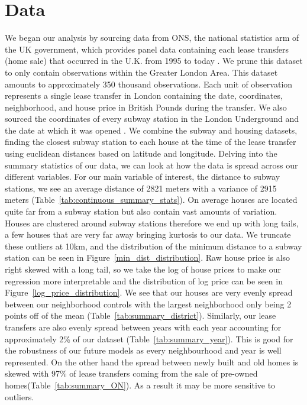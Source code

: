 \section{Data}
\label{sec:data}
We began our analysis by sourcing data from ONS, the national statistics arm of the UK government,
 which provides panel data containing each lease transfers (home sale) that occurred in the U.K. from 1995 to today \citep{land_ukgov}.
  We prune this dataset to only contain observations within the Greater London Area.
   This dataset amounts to approximately 350 thousand observations. Each unit of observation represents
    a single lease transfer in London containing the date, coordinates, neighborhood, and house price in British Pounds during the transfer.
      We also sourced the coordinates of every subway station in the
      London Underground and the date at which it was opened \citep{subway_wikipedia}. 
We combine the subway and housing datasets, finding the closest subway station to each house at the time of the lease transfer using euclidean distances based on latitude and longitude.
Delving into the summary statistics of our data, we can look at how the data is spread
 across our different variables. For our main variable of interest, the distance to subway stations, we see an
  average distance of 2821 meters with a variance of 2915 meters (Table~\ref{tab:continuous_summary_stats}). On average houses are located quite far from
   a subway station but also contain vast amounts of variation. Houses are clustered around subway stations therefore we end up with long tails, a few houses that are very far away bringing kurtosis to our data.
    We truncate these outliers at 10km, and the distribution of the minimum distance to a subway station can be seen in Figure~\ref{min_dist_distribution}.
     Raw house price is also right skewed with a long tail, so we take the log of house prices to make our regression more interpretable
      and the distribution of log price can be seen in Figure~\ref{log_price_distribution}.
We see that our houses are very evenly spread between our neighborhood controls with the largest
 neighborhood only being 2 points off of the mean (Table~\ref{tab:summary_district}). Similarly, our lease transfers are also evenly spread between years
  with each year accounting for approximately 2\% 
  of our dataset (Table~\ref{tab:summary_year}). This is good for the robustness of our future models as every neighbourhood and year is well represented. 
  On the other hand the spread between newly built and old homes is skewed with 97\%
   of lease transfers coming from the sale of pre-owned homes(Table~\ref{tab:summary_ON}). As a result it may be more sensitive to outliers.
